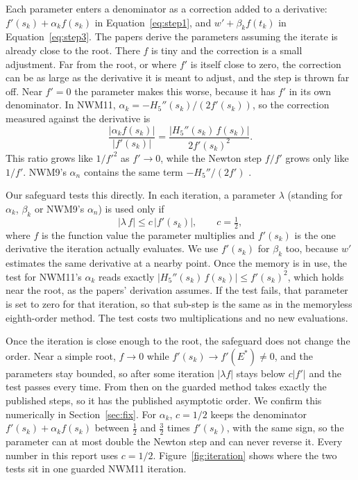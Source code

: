 \documentclass[sigconf,nonacm]{acmart}
\begin{document}
Each parameter enters a denominator as a correction added to a
derivative: $f'(s_k) + \alpha_k f(s_k)$ in Equation~\eqref{eq:step1}, and
$w' + \beta_k f(t_k)$ in Equation~\eqref{eq:step3}. The papers derive the
parameters assuming the iterate is already close to the root. There $f$ is
tiny and the correction is a small adjustment. Far from the root, or where
$f'$ is itself close to zero, the correction can be as large as the
derivative it is meant to adjust, and the step is thrown far off.
Near $f' = 0$ the parameter makes this worse, because it has $f'$ in its
own denominator. In NWM11,
$\alpha_k = -H_5''(s_k)/(2f'(s_k))$, so the correction measured against
the derivative is
\[
\frac{|\alpha_k f(s_k)|}{|f'(s_k)|}
  = \frac{|H_5''(s_k)\, f(s_k)|}{2 f'(s_k)^2}.
\]
This ratio grows like $1/f'^2$ as $f' \to 0$, while the Newton step
$f/f'$ grows only like $1/f'$. NWM9's $\alpha_n$ contains the same term
$-H_5''/(2f')$ \cite{nwm9}.

Our safeguard tests this directly. In each iteration, a parameter $\lambda$
(standing for $\alpha_k$, $\beta_k$ or NWM9's $\alpha_n$) is used only if
\begin{equation}
|\lambda\, f| \le c\, |f'(s_k)|, \qquad c = \tfrac{1}{2},
\label{eq:guard}
\end{equation}
where $f$ is the function value the parameter multiplies and $f'(s_k)$ is
the one derivative the iteration actually evaluates. We use $f'(s_k)$ for
$\beta_k$ too, because $w'$ estimates the same derivative at a nearby
point. Once the memory is in use, the test for NWM11's $\alpha_k$ reads
exactly $|H_5''(s_k)\, f(s_k)| \le f'(s_k)^2$, which holds near the root,
as the papers' derivation assumes. If the test fails,
that parameter is set to zero for that iteration, so that sub-step is the
same as in the memoryless eighth-order method. The test costs two multiplications and
no new evaluations.

Once the iteration is close enough to the root, the safeguard does not
change the order. Near a simple root, $f \to 0$ while
$f'(s_k) \to f'(E^*) \ne 0$, and the parameters stay bounded, so
after some iteration $|\lambda f|$ stays below $c|f'|$ and the test passes
every time. From then on the guarded method takes exactly the published
steps, so it has the published asymptotic order. We confirm this numerically in
Section~\ref{sec:fix}. For $\alpha_k$, $c = 1/2$ keeps the denominator
$f'(s_k) + \alpha_k f(s_k)$ between $\tfrac12$ and $\tfrac32$ times
$f'(s_k)$, with the same sign, so the parameter can at most double the
Newton step and can never reverse it. Every number in this report uses
$c = 1/2$.
Figure~\ref{fig:iteration} shows where the two tests sit in one
guarded NWM11 iteration.
\end{document}
